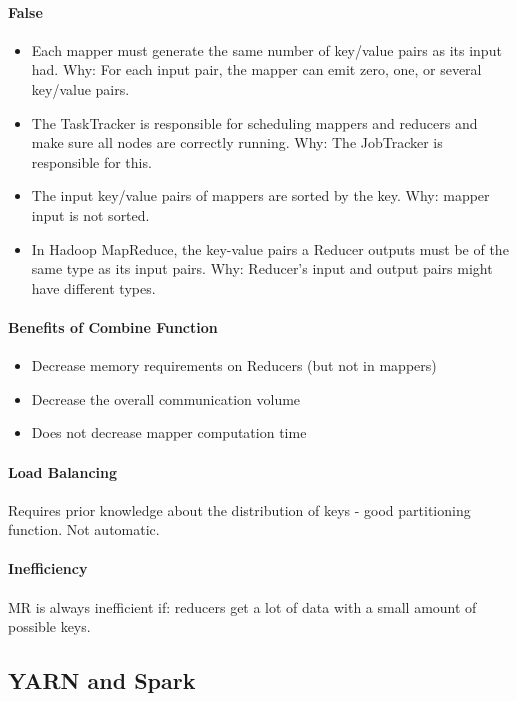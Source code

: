 \paragraph{False}
\begin{itemize}
    \item Each mapper must generate the same number of key/value pairs as its input had. Why: For each input pair, the mapper can emit zero, one, or several key/value pairs.
    \item The TaskTracker is responsible for scheduling mappers and reducers and make sure all nodes are correctly running. Why: The JobTracker is responsible for this.
    \item The input key/value pairs of mappers are sorted by the key. Why: mapper input is not sorted.
    \item In Hadoop MapReduce, the key-value pairs a Reducer outputs must be of the same type as its input pairs. Why: Reducer's input and output pairs might have different types.
\end{itemize}

\paragraph{Benefits of Combine Function}
\begin{itemize}
    \item Decrease memory requirements on Reducers (but not in mappers)
    \item Decrease the overall communication volume
    \item Does not decrease mapper computation time
\end{itemize}

\paragraph{Load Balancing}
Requires prior knowledge about the distribution of keys - good partitioning function. Not automatic. %

\paragraph{Inefficiency}
MR is always inefficient if: reducers get a lot of data with a small amount of possible keys.



\subsection{YARN and Spark}

